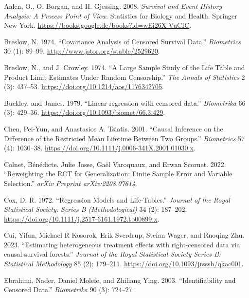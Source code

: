 \documentclass[
  11pt,
  a4paper,
]{article}
\newlength{\cslhangindent}
\newenvironment{CSLReferences}[2] %
 {\begin{list}{}{%
  \setlength{\itemindent}{0pt}
  \setlength{\leftmargin}{0pt}
  \setlength{\parsep}{0pt}
  \ifodd #1
   \setlength{\leftmargin}{\cslhangindent}
   \setlength{\itemindent}{-1\cslhangindent}
  \fi
  \setlength{\itemsep}{#2\baselineskip}}}
 {\end{list}}
\theoremstyle{plain}
\theoremstyle{plain}
\theoremstyle{plain}
\theoremstyle{definition}
\theoremstyle{remark}
\begin{document}
\label{refs}
\begin{CSLReferences}{1}{0}
Aalen, O., O. Borgan, and H. Gjessing. 2008. \emph{Survival and Event
History Analysis: A Process Point of View}. Statistics for Biology and
Health. Springer New York.
\url{https://books.google.de/books?id=wEi26X-VuCIC}.

Breslow, N. 1974. {``Covariance Analysis of Censored Survival Data.''}
\emph{Biometrics} 30 (1): 89--99.
\url{http://www.jstor.org/stable/2529620}.

Breslow, N., and J. Crowley. 1974. {``{A Large Sample Study of the Life
Table and Product Limit Estimates Under Random Censorship}.''} \emph{The
Annals of Statistics} 2 (3): 437--53.
\url{https://doi.org/10.1214/aos/1176342705}.

Buckley, and James. 1979. {``{Linear regression with censored data}.''}
\emph{Biometrika} 66 (3): 429--36.
\url{https://doi.org/10.1093/biomet/66.3.429}.

Chen, Pei-Yun, and Anastasios A. Tsiatis. 2001. {``Causal Inference on
the Difference of the Restricted Mean Lifetime Between Two Groups.''}
\emph{Biometrics} 57 (4): 1030--38.
\url{https://doi.org/10.1111/j.0006-341X.2001.01030.x}.

Colnet, Bénédicte, Julie Josse, Gaël Varoquaux, and Erwan Scornet. 2022.
{``Reweighting the RCT for Generalization: Finite Sample Error and
Variable Selection.''} \emph{arXiv Preprint arXiv:2208.07614}.

Cox, D. R. 1972. {``Regression Models and Life-Tables.''} \emph{Journal
of the Royal Statistical Society: Series B (Methodological)} 34 (2):
187--202. \url{https://doi.org/10.1111/j.2517-6161.1972.tb00899.x}.

Cui, Yifan, Michael R Kosorok, Erik Sverdrup, Stefan Wager, and Ruoqing
Zhu. 2023. {``{Estimating heterogeneous treatment effects with
right-censored data via causal survival forests}.''} \emph{Journal of
the Royal Statistical Society Series B: Statistical Methodology} 85 (2):
179--211. \url{https://doi.org/10.1093/jrsssb/qkac001}.

Ebrahimi, Nader, Daniel Molefe, and Zhiliang Ying. 2003.
{``Identifiability and Censored Data.''} \emph{Biometrika} 90 (3):
724--27.


\end{CSLReferences}
\end{document}
